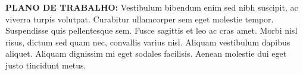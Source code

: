 \documentclass[12pt,a4paper,oneside]{article}%
\begin{document}
\begin{enumerate}
{\begin{tabularx}{\linewidth}
\hline%
\end{tabularx}%
\linebreak%
\begin{mdframed}[innertopmargin=5pt, innerleftmargin=3pt, innerrightmargin=3pt, topline=false]%
\textbf{PLANO DE TRABALHO: }%
Vestibulum bibendum enim sed nibh suscipit, ac viverra turpis volutpat. Curabitur ullamcorper sem eget molestie tempor. Suspendisse quis pellentesque sem. Fusce sagittis et leo ac cras amet.%
\newline%
Morbi nisl risus, dictum sed quam nec, convallis varius nisl. Aliquam vestibulum dapibus aliquet. Aliquam dignissim mi eget sodales facilisis. Aenean molestie dui eget justo tincidunt metus.%
\newline%
\end{mdframed}%
}%
\end{enumerate}%
\end{document}
